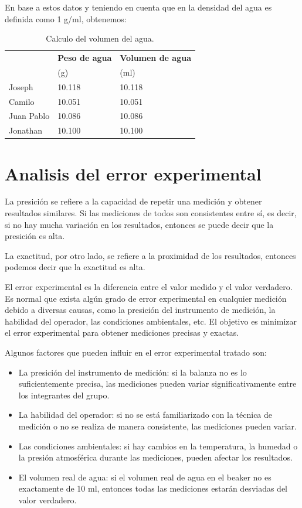 \documentclass[letterpaper]{IEEEconf}
\begin{document}
En base a estos datos y teniendo en cuenta que en \cite{atares} la densidad del agua es definida como 1 g/ml,  obtenemos:

\begin{table}[H]
\centering
\begin{tabular}{|p{2cm}|p{2cm}|p{2cm}|}
\hline
 & \bfseries Peso de agua & \bfseries Volumen de agua \\
 & (g) & (ml) \\
\hline
Joseph & 10.118 & 10.118 \\
\hline
Camilo & 10.051 & 10.051 \\
\hline
Juan Pablo & 10.086 & 10.086 \\
\hline
Jonathan & 10.100 & 10.100 \\
\hline
\end{tabular}
\caption{Calculo del volumen del agua.}
\label{tab:volumen}
\end{table}

\section{Analisis del error experimental}

La presición se refiere a la capacidad de repetir una medición y obtener resultados similares. Si las mediciones de todos son consistentes entre sí, es decir, si no hay mucha variación en los resultados, entonces se puede decir que la presición es alta.

La exactitud, por otro lado, se refiere a la proximidad de los resultados, entonces podemos decir que la exactitud es alta.

El error experimental es la diferencia entre el valor medido y el valor verdadero. Es normal que exista algún grado de error experimental en cualquier medición debido a diversas causas, como la presición del instrumento de medición, la habilidad del operador, las condiciones ambientales, etc. El objetivo es minimizar el error experimental para obtener mediciones precisas y exactas.

Algunos factores que pueden influir en el error experimental tratado son:

\begin{itemize}
\item La presición del instrumento de medición: si la balanza no es lo suficientemente precisa, las mediciones pueden variar significativamente entre los integrantes del grupo.
\item La habilidad del operador: si no se está familiarizado con la técnica de medición o no se realiza de manera consistente, las mediciones pueden variar.
\item Las condiciones ambientales: si hay cambios en la temperatura, la humedad o la presión atmosférica durante las mediciones, pueden afectar los resultados.
\item El volumen real de agua: si el volumen real de agua en el beaker no es exactamente de 10 ml, entonces todas las mediciones estarán desviadas del valor verdadero.
\end{itemize}
\end{document}
